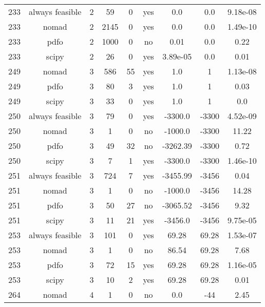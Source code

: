 \begin{scriptsize}
\begin{center}
\begin{longtable}{ccccccccc}
233 & always feasible &  2 &     59 &      0 &     yes &         0.0 &         0.0 & 9.18e-08\\
233 &           nomad &  2 &   2145 &      0 &     yes &         0.0 &         0.0 & 1.49e-10\\
233 &            pdfo &  2 &   1000 &      0 &      no &        0.01 &         0.0 &     0.22\\
233 &           scipy &  2 &     26 &      0 &     yes &    3.89e-05 &         0.0 &     0.01\\
249 &           nomad &  3 &    586 &     55 &     yes &         1.0 &           1 & 1.13e-08\\
249 &            pdfo &  3 &     80 &      3 &     yes &         1.0 &           1 &     0.03\\
249 &           scipy &  3 &     33 &      0 &     yes &         1.0 &           1 &      0.0\\
250 & always feasible &  3 &     79 &      0 &     yes &     -3300.0 &       -3300 & 4.52e-09\\
250 &           nomad &  3 &      1 &      0 &      no &     -1000.0 &       -3300 &    11.22\\
250 &            pdfo &  3 &     49 &     32 &      no &    -3262.39 &       -3300 &     0.72\\
250 &           scipy &  3 &      7 &      1 &     yes &     -3300.0 &       -3300 & 1.46e-10\\
251 & always feasible &  3 &    724 &      7 &     yes &    -3455.99 &       -3456 &     0.04\\
251 &           nomad &  3 &      1 &      0 &      no &     -1000.0 &       -3456 &    14.28\\
251 &            pdfo &  3 &     50 &     27 &      no &    -3065.52 &       -3456 &     9.32\\
251 &           scipy &  3 &     11 &     21 &     yes &     -3456.0 &       -3456 & 9.75e-05\\
253 & always feasible &  3 &    101 &      0 &     yes &       69.28 &       69.28 & 1.53e-07\\
253 &           nomad &  3 &      1 &      0 &      no &       86.54 &       69.28 &     7.68\\
253 &            pdfo &  3 &     72 &     15 &     yes &       69.28 &       69.28 & 1.16e-05\\
253 &           scipy &  3 &     10 &      2 &     yes &       69.28 &       69.28 &     0.01\\
264 &           nomad &  4 &      1 &      0 &      no &         0.0 &         -44 &     2.45\\

\end{longtable}
\end{center}
\end{scriptsize}
